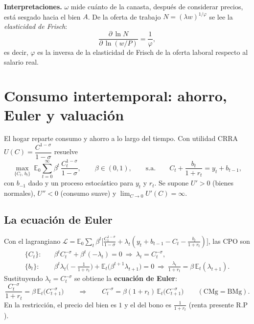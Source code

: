 \documentclass[11pt]{article}
\newenvironment{notabox}[1][Nota]%
  {\par\medskip\noindent\textbf{#1.}\enspace\ignorespaces}%
  {\par\medskip}
\theoremstyle{definition}
\newcommand{\E}{\mathbb{E}}
\begin{document}
\begin{notabox}[Interpretaciones]
$\omega$ mide cuánto de la canasta, después de considerar precios, está sesgado hacia el bien $A$.
De la oferta de trabajo $N=(\lambda w)^{1/\varphi}$ se lee la \emph{elasticidad de Frisch}:
\[
\frac{\partial\,\ln N}{\partial\,\ln(w/P)}=\frac{1}{\varphi},
\]
es decir, $\varphi$ es la inversa de la elasticidad de Frisch de la oferta laboral respecto al salario real.
\end{notabox}

\section{Consumo intertemporal: ahorro, Euler y valuación}

El hogar reparte consumo y ahorro a lo largo del tiempo. Con utilidad CRRA
$U(C)=\dfrac{C^{1-\sigma}}{1-\sigma}$ resuelve
\begin{equation}
\max_{\{C_{t},\,b_{t}\}}\ \E_{0}\sum_{t=0}^{\infty}\beta^{t}\,\frac{C_{t}^{1-\sigma}}{1-\sigma},
\qquad \beta\in(0,1),
\qquad\text{s.a.}\qquad
C_{t}+\frac{b_{t}}{1+r_{t}}=y_{t}+b_{t-1},
\end{equation}
con $b_{-1}$ dado y un proceso estocástico para $y_{t}$ y $r_{t}$. Se supone $U'>0$ (bienes normales),
$U''<0$ (consumo suave) y $\lim_{C\to0}U'(C)=\infty$.

\subsection{La ecuación de Euler}

Con el lagrangiano
$\mathcal{L}=\E_{0}\sum_{t}\beta^{t}\big[\tfrac{C_{t}^{1-\sigma}}{1-\sigma}+\lambda_{t}(y_{t}+b_{t-1}-C_{t}-\tfrac{b_{t}}{1+r_{t}})\big]$,
las CPO son
\begin{align}
\{C_{t}\}:\quad & \beta^{t}C_{t}^{-\sigma}+\beta^{t}(-\lambda_{t})=0\ \Longrightarrow\ \lambda_{t}=C_{t}^{-\sigma},\\
\{b_{t}\}:\quad & \beta^{t}\lambda_{t}\Big(-\frac{1}{1+r_{t}}\Big)+\E_{t}\big(\beta^{t+1}\lambda_{t+1}\big)=0
\ \Longrightarrow\ \frac{\lambda_{t}}{1+r_{t}}=\beta\,\E_{t}(\lambda_{t+1}).
\end{align}
Sustituyendo $\lambda_{t}=C_{t}^{-\sigma}$ se obtiene la \textbf{ecuación de Euler}:
\begin{equation}
\frac{C_{t}^{-\sigma}}{1+r_{t}}=\beta\,\E_{t}\big(C_{t+1}^{-\sigma}\big)
\qquad\Longrightarrow\qquad
C_{t}^{-\sigma}=\beta(1+r_{t})\,\E_{t}\big(C_{t+1}^{-\sigma}\big)\qquad(\text{CMg}=\text{BMg}).
\end{equation}
En la restricción, el precio del bien es $1$ y el del bono es $\tfrac{1}{1+r_{t}}$ (renta presente $\text{R.P}$).
\end{document}

